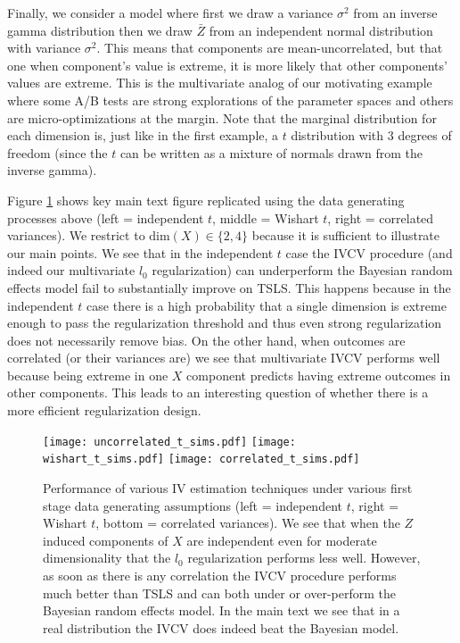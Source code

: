 \documentclass{article}
\begin{document}
Finally, we consider a model where first we draw a variance $\sigma^2$ from an inverse gamma distribution then we draw $\bar{Z}$ from an independent normal distribution with variance $\sigma^2.$ This means that components are mean-uncorrelated, but that one when component's value is extreme, it is more likely that other components' values are extreme. This is the multivariate analog of our motivating example where some A/B tests are strong explorations of the parameter spaces and others are micro-optimizations at the margin. Note that the marginal distribution for each dimension is, just like in the first example, a $t$ distribution with $3$ degrees of freedom (since the $t$ can be written as a mixture of normals drawn from the inverse gamma). 

Figure \ref{fig:tsims} shows key main text figure replicated using the data generating processes above (left = independent $t$, middle = Wishart $t$, right = correlated variances). We restrict to $\text{dim}(X) \in \lbrace 2, 4 \rbrace$ because it is sufficient to illustrate our main points. We see that in the independent $t$ case the IVCV procedure (and indeed our multivariate $l_0$ regularization) can underperform the Bayesian random effects model fail to substantially improve on TSLS. This happens because in the independent $t$ case there is a high probability that a single dimension is extreme enough to pass the regularization threshold and thus even strong regularization does not necessarily remove bias. On the other hand, when outcomes are correlated (or their variances are) we see that multivariate IVCV performs well because being extreme in one $X$ component predicts having extreme outcomes in other components. This leads to an interesting question of whether there is a more efficient regularization design. 

\begin{figure}[h!]
	\begin{center}
		\texttt{[image: uncorrelated\_t\_sims.pdf]}
		\texttt{[image: wishart\_t\_sims.pdf]}
		\texttt{[image: correlated\_t\_sims.pdf]}
	\end{center}
	\caption{Performance of various IV estimation techniques under various first stage data generating assumptions (left = independent $t$, right = Wishart $t$, bottom = correlated variances). We see that when the $Z$ induced components of $X$ are independent even for moderate dimensionality that the $l_0$ regularization performs less well. However, as soon as there is any correlation the IVCV procedure performs much better than TSLS and can both under or over-perform the Bayesian random effects model. In the main text we see that in a real distribution the IVCV does indeed beat the Bayesian model.}
	\label{fig:tsims}
\end{figure}
\end{document}

